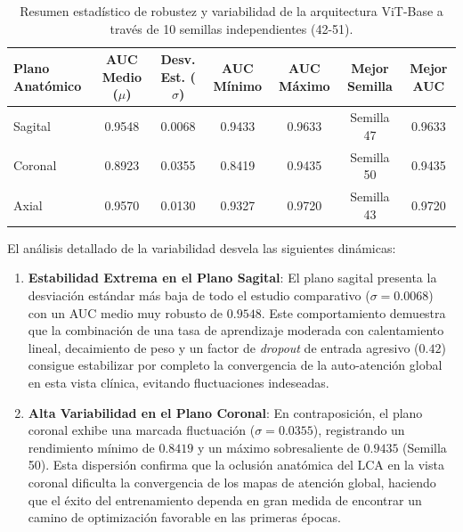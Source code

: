 \begin{table}[htbp]
\centering
\caption{Resumen estadístico de robustez y variabilidad de la arquitectura ViT-Base a través de 10 semillas independientes (42-51).}
\label{tab:multiseed_vitbase}
\begin{tabular}{lcccccc}
\hline
\textbf{Plano Anatómico} & \textbf{AUC Medio ($\mu$)} & \textbf{Desv. Est. ($\sigma$)} & \textbf{AUC Mínimo} & \textbf{AUC Máximo} & \textbf{Mejor Semilla} & \textbf{Mejor AUC} \\ \hline
Sagital                  & 0.9548                     & 0.0068                         & 0.9433              & 0.9633              & Semilla 47             & 0.9633             \\
Coronal                  & 0.8923                     & 0.0355                         & 0.8419              & 0.9435              & Semilla 50             & 0.9435             \\
Axial                    & 0.9570                     & 0.0130                         & 0.9327              & 0.9720              & Semilla 43             & 0.9720             \\ \hline
\end{tabular}
\end{table}

El análisis detallado de la variabilidad desvela las siguientes dinámicas:
\begin{enumerate}
    \item \textbf{Estabilidad Extrema en el Plano Sagital}: El plano sagital presenta la desviación estándar más baja de todo el estudio comparativo ($\sigma = 0.0068$) con un AUC medio muy robusto de $0.9548$. Este comportamiento demuestra que la combinación de una tasa de aprendizaje moderada con calentamiento lineal, decaimiento de peso y un factor de \textit{dropout} de entrada agresivo ($0.42$) consigue estabilizar por completo la convergencia de la auto-atención global en esta vista clínica, evitando fluctuaciones indeseadas.
    \item \textbf{Alta Variabilidad en el Plano Coronal}: En contraposición, el plano coronal exhibe una marcada fluctuación ($\sigma = 0.0355$), registrando un rendimiento mínimo de $0.8419$ y un máximo sobresaliente de $0.9435$ (Semilla 50). Esta dispersión confirma que la oclusión anatómica del LCA en la vista coronal dificulta la convergencia de los mapas de atención global, haciendo que el éxito del entrenamiento dependa en gran medida de encontrar un camino de optimización favorable en las primeras épocas.
\end{enumerate}

